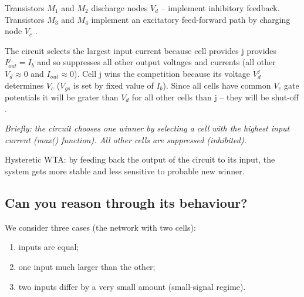\documentclass[report]{subfiles}
\begin{document}
Transistors $M_1$ and $M_2$ discharge nodes $V_d$ -- implement inhibitory feedback. Transistors $M_3$ and $M_4$
 implement an excitatory feed-forward path by charging node $V_c$ . 
 
 The circuit selects the largest input current because cell provides j provides $I_{out}^j = I_b$  and so suppresses all other output voltages and currents (all other $V_d \approx 0$ and $I_{out} \approx 0$). Cell j wins the competition because its voltage $V_d^j$
determines $V_c$ ($V_{gs}$ is set by fixed value of $I_b$). Since all cells have common $V_c$ gate potentials it will be grater than $V_d$ for all other cells than j -- they will be shut-off \cite{book:VLSI}. 




\textit{Briefly: the circuit chooses one winner by selecting a cell with the highest input current (max() function). All other cells are suppressed (inhibited).}

Hysteretic WTA: by feeding back the output of the circuit to its input, the system gets more stable and less sensitive to probable new winner.

\subsection{Can you reason through its behaviour?}
We consider three cases (the network with two cells): 

\begin{enumerate}[label={I.}]
\item inputs are equal; 
\item one input much larger than the other; 
\item two inputs differ by a very small amount (small-signal regime).
\end{enumerate}
\end{document}
